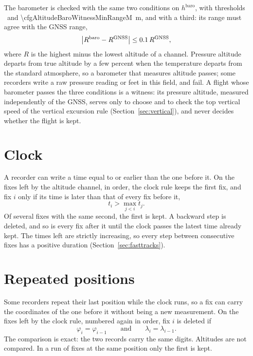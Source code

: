 The barometer is checked with the same two conditions on $h^{\mathrm{baro}}$, with
thresholds \cfgAltitudeBaroWitnessPresentMin\ and
\SI{\cfgAltitudeBaroWitnessMinRangeM}{\metre}, and with a third: its range must agree
with the GNSS range,
\begin{equation}
  \bigl|R^{\mathrm{baro}}-R^{\mathrm{GNSS}}\bigr|
  \leq0.1\,R^{\mathrm{GNSS}},
  \label{eq:baro-witness}
\end{equation}
where $R$ is the highest minus the lowest altitude of a channel. Pressure altitude
departs from true altitude by a few percent when the temperature departs from the
standard atmosphere, so a barometer that measures altitude passes; some recorders write
a raw pressure reading or feet in this field, and fail. A flight whose barometer passes
the three conditions is a witness: its pressure altitude, measured independently of the
GNSS, serves only to choose and to check the top vertical speed of the vertical
excursion rule (Section~\ref{sec:vertical}), and never decides whether the flight is
kept.

\section{Clock}
\label{sec:clock}

A recorder can write a time equal to or earlier than the one before it. On the fixes
left by the altitude channel, in order, the clock rule keeps the first fix, and fix $i$
only if its time is later than that of every fix before it,
\begin{equation}
  t_i>\max_{j<i}t_j.
  \label{eq:clock}
\end{equation}
Of several fixes with the same second, the first is kept. A backward step is deleted,
and so is every fix after it until the clock passes the latest time already kept. The
times left are strictly increasing, so every step between consecutive fixes has a
positive duration (Section~\ref{sec:fasttracks}).

\section{Repeated positions}
\label{sec:repeated}

Some recorders repeat their last position while the clock runs, so a fix can carry the
coordinates of the one before it without being a new measurement. On the fixes left by
the clock rule, numbered again in order, fix $i$ is deleted if
\begin{equation}
  \varphi_i=\varphi_{i-1}\qquad\text{and}\qquad\lambda_i=\lambda_{i-1}.
  \label{eq:repeated}
\end{equation}
The comparison is exact: the two records carry the same digits. Altitudes are not
compared. In a run of fixes at the same position only the first is kept.

